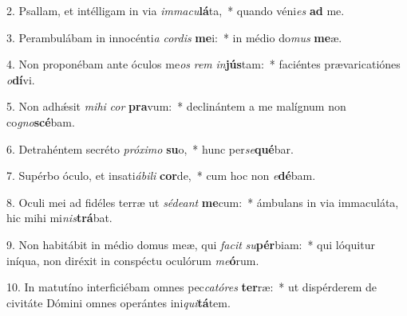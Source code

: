 2. Psallam, et intélligam in via \textit{im}\textit{ma}\textit{cu}\textbf{lá}ta,~*  quando véni\textit{es} \textbf{ad} me.\

3. Perambulábam in innocénti\textit{a} \textit{cor}\textit{dis} \textbf{me}i:~*  in médio do\textit{mus} \textbf{me}æ.\

4. Non proponébam ante óculos me\textit{os} \textit{rem} \textit{in}\textbf{jús}tam:~*  faciéntes prævaricatiónes \textit{o}\textbf{dí}vi.\

5. Non adhǽsit \textit{mi}\textit{hi} \textit{cor} \textbf{pra}vum:~*  declinántem a me malígnum non co\textit{gno}\textbf{scé}bam.\

6. Detrahéntem secréto \textit{pró}\textit{xi}\textit{mo} \textbf{su}o,~*  hunc per\textit{se}\textbf{qué}bar.\

7. Supérbo óculo, et insati\textit{á}\textit{bi}\textit{li} \textbf{cor}de,~*  cum hoc non \textit{e}\textbf{dé}bam.\

8. Oculi mei ad fidéles terræ ut \textit{sé}\textit{de}\textit{ant} \textbf{me}cum:~*  ámbulans in via immaculáta, hic mihi mi\textit{nis}\textbf{trá}bat.\

9. Non habitábit in médio domus meæ, qui \textit{fa}\textit{cit} \textit{su}\textbf{pér}biam:~*  qui lóquitur iníqua, non diréxit in conspéctu oculórum \textit{me}\textbf{ó}rum.\

10. In matutíno interficiébam omnes pec\textit{ca}\textit{tó}\textit{res} \textbf{ter}ræ:~*  ut dispérderem de civitáte Dómini omnes operántes ini\textit{qui}\textbf{tá}tem.\

